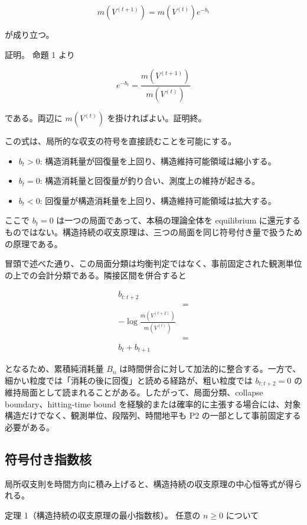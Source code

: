 \documentclass[12pt,a4paper]{article}
\begin{document}
\[
m(V^{(t+1)}) = m(V^{(t)}) e^{-b_{t}}
\]

が成り立つ。

証明。 命題 1 より

\[
e^{-b_{t}} = \frac{m(V^{(t+1)})}{m(V^{(t)})}
\]

である。両辺に \(m(V^{(t)})\) を掛ければよい。証明終。

この式は、局所的な収支の符号を直接読むことを可能にする。

\begin{itemize}
\tightlist
\item
  \(b_{t}>0\): 構造消耗量が回復量を上回り、構造維持可能領域は縮小する。
\item
  \(b_{t}=0\): 構造消耗量と回復量が釣り合い、測度上の維持が起きる。
\item
  \(b_{t}<0\): 回復量が構造消耗量を上回り、構造維持可能領域は拡大する。
\end{itemize}

ここで \(b_{t}=0\) は一つの局面であって、本稿の理論全体を equilibrium に還元するものではない。構造持続の収支原理は、三つの局面を同じ符号付き量で扱うための原理である。

冒頭で述べた通り、この局面分類は均衡判定ではなく、事前固定された観測単位の上での会計分類である。隣接区間を併合すると

\[
\begin{aligned}
b_{t:t+2} \\
&= \\
-\log\frac{m(V^{(t+2)})}{m(V^{(t)})} \\
&= \\
b_{t}+b_{t+1}
\end{aligned}
\]

となるため、累積純消耗量 \(B_{n}\) は時間併合に対して加法的に整合する。一方で、細かい粒度では「消耗の後に回復」と読める経路が、粗い粒度では \(b_{t:t+2}=0\) の維持局面として読まれることがある。したがって、局面分類、collapse boundary、hitting-time bound を経験的または確率的に主張する場合には、対象構造だけでなく、観測単位、段階列、時間地平も P2 の一部として事前固定する必要がある。

\subsection{符号付き指数核}\label{ux7b26ux53f7ux4ed8ux304dux6307ux6570ux6838}

局所収支則を時間方向に積み上げると、構造持続の収支原理の中心恒等式が得られる。

定理 1（構造持続の収支原理の最小指数核）。 任意の \(n\ge 0\) について
\end{document}
